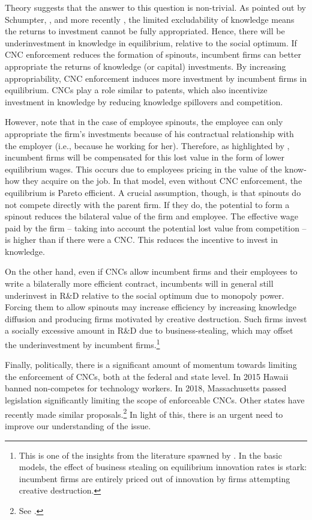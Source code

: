 \documentclass[12pt,english]{article}
\theoremstyle{remark}
\begin{document}
Theory suggests that the answer to this question is non-trivial. As pointed out by Schumpter, \cite{arrow_economic_1962}, and more recently \cite{romer_increasing_1986}, the limited excludability of knowledge means the returns to investment cannot be fully appropriated. Hence, there will be underinvestment in knowledge in equilibrium, relative to the social optimum. If CNC enforcement reduces the formation of spinouts, incumbent firms can better appropriate the returns of knowledge (or capital) investments. By increasing appropriability, CNC enforcement induces more investment by incumbent firms in equilibrium. CNCs play a role similar to patents, which also incentivize investment in knowledge by reducing knowledge spillovers and competition.

However, note that in the case of employee spinouts, the employee can only appropriate the firm's investments because of his contractual relationship with the employer  (i.e., because he working for her).  Therefore, as highlighted by \cite{franco_spin-outs:_2006}, incumbent firms will be compensated for this lost value in the form of lower equilibrium wages. This occurs due to employees pricing in the value of the know-how they acquire on the job. In that model, even without CNC enforcement, the equilibrium is Pareto efficient. A crucial assumption, though, is that spinouts do not compete directly with the parent firm. If they do, the potential to form a spinout reduces the bilateral value of the firm and employee. The effective wage paid by the firm -- taking into account the potential lost value from competition -- is higher than if there were a CNC. This reduces the incentive to invest in knowledge. 

On the other hand, even if CNCs allow incumbent firms and their employees to write a bilaterally more efficient contract, incumbents will in general still underinvest in R\&D relative to the social optimum due to monopoly power. Forcing them to allow spinouts may increase efficiency by increasing knowledge diffusion and producing firms motivated by creative destruction. Such firms invest a socially excessive amount in R\&D due to business-stealing, which may offset the underinvestment by incumbent firms.\footnote{This is one of the insights from the literature spawned by \cite{grossman_quality_1991}. In the basic models, the effect of business stealing on equilibrium innovation rates is stark: incumbent firms are entirely priced out of innovation by firms attempting creative destruction.}

Finally, politically, there is a significant amount of momentum towards limiting the enforcement of CNCs, both at the federal and state level. In 2015 Hawaii banned non-competes for technology workers. In 2018, Massachusetts passed legislation significantly limiting the scope of enforceable CNCs. Other states have recently made similar proposals.\footnote{See \cite{the_white_house_technical_report_non-compete_2016}.} In light of this, there is an urgent need to improve our understanding of the issue. 
\end{document}
